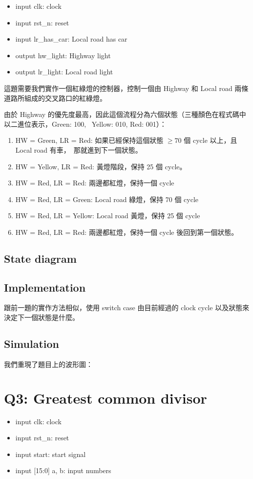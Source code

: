 \documentclass[10.5pt,compsoc,UTF8]{CjC}
\theoremstyle{mystyle}
\begin{document}
\begin{itemize}
  \item input clk: clock
  \item input rst\_n: reset
  \item input lr\_has\_car: Local road has car
  \item output hw\_light: Highway light
  \item output lr\_light: Local road light
\end{itemize}

這題需要我們實作一個紅綠燈的控制器，控制一個由 Highway 和 Local road 兩條道路所組成的交叉路口的紅綠燈。
\par
由於 Highway 的優先度最高，因此這個流程分為六個狀態（三種顏色在程式碼中以二進位表示，Green: 100, \
Yellow: 010, Red: 001）：
\begin{enumerate}
  \item HW = Green, LR = Red: 如果已經保持這個狀態 $\ge 70$ 個 cycle 以上，且 Local road 有車，\
        那就進到下一個狀態。
  \item HW = Yellow, LR = Red: 黃燈階段，保持 25 個 cycle。
  \item HW = Red, LR = Red: 兩邊都紅燈，保持一個 cycle
  \item HW = Red, LR = Green: Local road 綠燈，保持 70 個 cycle
  \item HW = Red, LR = Yellow: Local road 黃燈，保持 25 個 cycle
  \item HW = Red, LR = Red: 兩邊都紅燈，保持一個 cycle 後回到第一個狀態。
\end{enumerate}

\subsection{State diagram}

\subsection{Implementation}
跟前一題的實作方法相似，使用 switch case 由目前經過的 clock cycle 以及狀態來決定下一個狀態是什麼。


\subsection{Simulation}
我們重現了題目上的波形圖：

\section{Q3: Greatest common divisor}
\begin{itemize}
  \item input clk: clock
  \item input rst\_n: reset
  \item input start: start signal
  \item input [15:0] a, b: input numbers
\end{itemize}
\end{document}
